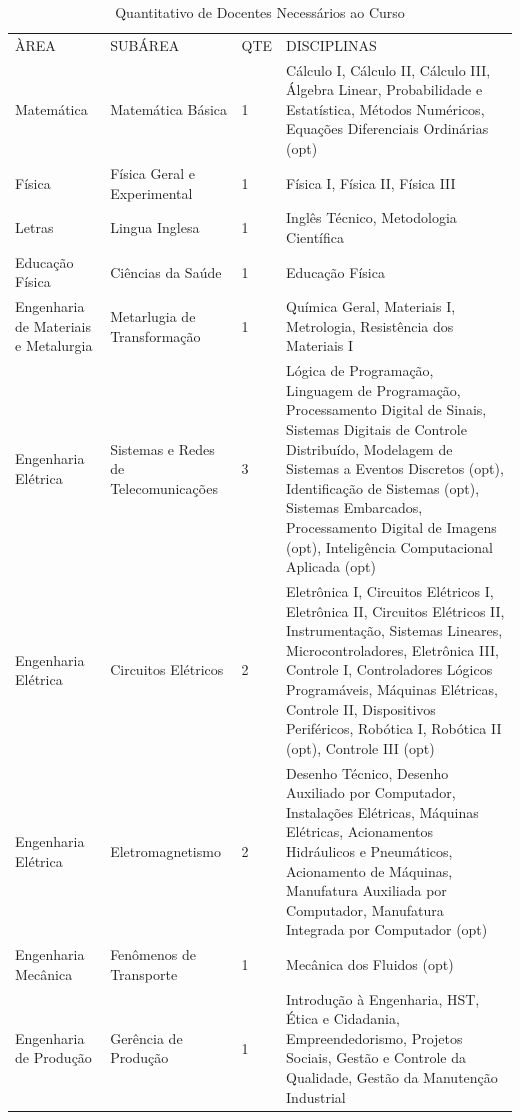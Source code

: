 \documentclass{paper}
\begin{document}
\if{}
    \begin{longtable}{|p{3.0cm}|p{3.0cm}|p{1.0cm}|p{6.8cm}|}
    \caption{Quantitativo de Docentes Necessários ao Curso}\label{tab1} 
    \vspace{-0.25cm}
    \\ \hline 
    \cellcolor{\cinza}ÀREA & \cellcolor{\cinza}SUBÁREA & \cellcolor{\cinza}QTE & \cellcolor{\cinza}DISCIPLINAS \\ 
    \hline
    Matemática   &  Matemática Básica  &  1  &  Cálculo I, Cálculo II, Cálculo III, Álgebra Linear, Probabilidade e Estatística, Métodos Numéricos, Equações Diferenciais Ordinárias (opt) \\ \hline
    Física   &  Física Geral e Experimental  &  1  &  Física I, Física II, Física III \\ \hline
    Letras   &  Lingua Inglesa  &  1  &  Inglês Técnico, Metodologia Científica \\ \hline
    Educação Física &  Ciências da Saúde  &  1  &  Educação Física \\ \hline
    Engenharia de Materiais e Metalurgia  &  Metarlugia de Transformação  &  1  &  Química Geral, Materiais I, Metrologia, Resistência dos Materiais I \\ \hline
    Engenharia Elétrica   &  Sistemas e Redes de Telecomunicações  &  3  &  Lógica de Programação, Linguagem de Programação, Processamento Digital de Sinais, Sistemas Digitais de Controle Distribuído, Modelagem de Sistemas a Eventos Discretos (opt), Identificação de Sistemas (opt), Sistemas Embarcados, Processamento Digital de Imagens (opt), Inteligência Computacional Aplicada (opt) \\ \hline
    Engenharia Elétrica   &  Circuitos Elétricos  &  2  &  Eletrônica I, Circuitos Elétricos I, Eletrônica II, Circuitos Elétricos II, Instrumentação, Sistemas Lineares, Microcontroladores, Eletrônica III, Controle I, Controladores Lógicos Programáveis, Máquinas Elétricas, Controle II, Dispositivos Periféricos, Robótica I, Robótica II (opt), Controle III (opt) \\ \hline
    Engenharia Elétrica   &  Eletromagnetismo  &  2  &  Desenho Técnico, Desenho Auxiliado por Computador, Instalações Elétricas, Máquinas Elétricas, Acionamentos Hidráulicos e Pneumáticos, Acionamento de Máquinas, Manufatura Auxiliada por Computador, Manufatura Integrada por Computador (opt) \\ \hline
    Engenharia Mecânica   &  Fenômenos de Transporte  &  1  &  Mecânica dos Fluidos (opt) \\ \hline
    Engenharia de Produção   &  Gerência de Produção  &  1  &  Introdução à Engenharia, HST, Ética e Cidadania, Empreendedorismo, Projetos Sociais, Gestão e Controle da Qualidade, Gestão da Manutenção Industrial \\ \hline
   \end{longtable}
\end{document}
